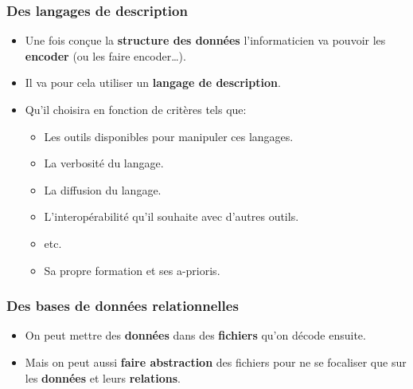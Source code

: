 \subsubsection{Des langages de description}

\begin{slide}
  \begin{itemize}
    \item Une fois conçue la \textbf{structure des données} l'informaticien va pouvoir les \textbf{encoder} (ou les faire encoder…).
    \item Il va pour cela utiliser un \textbf{langage de description}.
    \item Qu'il choisira en fonction de critères tels que:
      \begin{itemize}
	\item Les outils disponibles pour manipuler ces langages.
	\item La verbosité du langage.
	\item La diffusion du langage.
	\item L'interopérabilité qu'il souhaite avec d'autres outils.
	\item etc.
	\item Sa propre formation et ses a-prioris.
      \end{itemize}
  \end{itemize}
\end{slide}

\begin{slide}

		\beamerdefaultoverlayspecification{}

		
\end{slide}

\subsubsection{Des bases de données relationnelles}
\begin{slide}
	\begin{itemize}
		\item On peut mettre des \textbf{données} dans des \textbf{fichiers} qu'on décode ensuite.
		\item Mais on peut aussi \textbf{faire abstraction} des fichiers pour ne se focaliser que sur les \textbf{données} et leurs \textbf{relations}.
	\end{itemize}
\end{slide}

